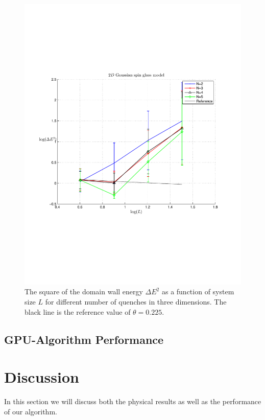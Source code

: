 \documentclass[paper=a4, fontsize=11pt]{scrartcl} %
\numberwithin{equation}{section} %
\numberwithin{figure}{section} %
\numberwithin{table}{section} %
\begin{document}
\begin{figure}
\centering
\includegraphics[width=\textwidth]{images/spinglass3D.pdf}
\caption{The square of the domain wall energy $\Delta E ^ 2$ as a function of system size $L$ for different number of quenches in three dimensions. The black line is the reference value of $\theta=0.225$.}
\label{fig:E_3D}
\end{figure}

\subsection{GPU-Algorithm Performance}

\section{Discussion}
\label{sec:discussion}
In this section we will discuss both the physical results as well as the performance of our algorithm.
\end{document}
